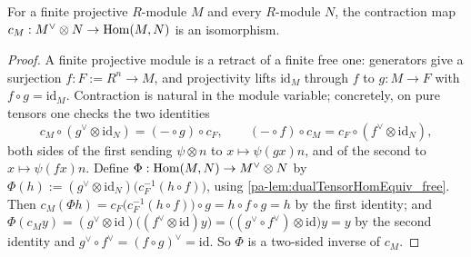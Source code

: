 \begin{theorem}
  \label{pa-thm:dualTensorHom_projective}
  \leanok

  For a finite projective \(R\)-module \(M\) and every \(R\)-module \(N\), the
  contraction map \(c_M : M^{\vee} \otimes N \to \operatorname{Hom}(M, N)\) is an isomorphism.
\end{theorem}
\begin{proof}
  \leanok
  A finite projective module is a retract of a finite free one: generators give a
  surjection \(f : F := R^n \to M\), and projectivity lifts \(\mathrm{id}_M\) through
  \(f\) to \(g : M \to F\) with \(f \circ g = \mathrm{id}_M\). Contraction is natural in
  the module variable; concretely, on pure tensors one checks the two identities
  \[
    c_M \circ (g^{\vee} \otimes \mathrm{id}_N) = (- \circ g) \circ c_F,
    \qquad
    (- \circ f) \circ c_M = c_F \circ (f^{\vee} \otimes \mathrm{id}_N),
  \]
  both sides of the first sending \(\psi \otimes n\) to \(x \mapsto \psi(g x) n\), and
  of the second to \(x \mapsto \psi(f x) n\). Define
  \(\Phi : \operatorname{Hom}(M, N) \to M^{\vee} \otimes N\) by
  \(\Phi(h) := (g^{\vee} \otimes \mathrm{id}_N)\bigl(c_F^{-1}(h \circ f)\bigr)\), using
  \ref{pa-lem:dualTensorHomEquiv_free}. Then
  \(c_M(\Phi h) = c_F\bigl(c_F^{-1}(h \circ f)\bigr) \circ g = h \circ f \circ g = h\)
  by the first identity; and
  \(\Phi(c_M y) = (g^{\vee} \otimes \mathrm{id})\bigl((f^{\vee} \otimes \mathrm{id})
  y\bigr) = \bigl((g^{\vee} \circ f^{\vee}) \otimes \mathrm{id}\bigr) y = y\) by the
  second identity and \(g^{\vee} \circ f^{\vee} = (f \circ g)^{\vee} =
  \mathrm{id}\). So \(\Phi\) is a two-sided inverse of \(c_M\).
\end{proof}

